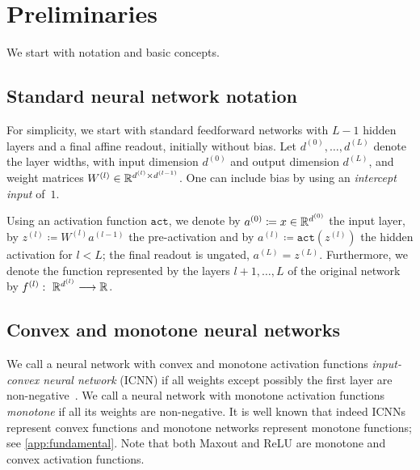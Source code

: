\section{Preliminaries}\label{sec:prelim}

We start with notation and basic concepts.

\subsection{Standard neural network notation}\label{subsec:relu_notation}

For simplicity, we start with
standard feedforward networks with $L-1$ hidden layers and a final affine readout, initially without bias.
Let $d^{(0)}, \ldots, d^{(L)}$ denote the layer widths, with input dimension $d^{(0)}$ and output dimension $d^{(L)}$, and
weight matrices $W^{(l)} \in \mathbb{R}^{d^{(l)} \times d^{(l-1)}}$.
One can include bias by using an \emph{intercept input} of~$1$. 

Using an activation function $\mathtt{act}$, we denote by $a^{(0)} \coloneqq x \in \mathbb{R}^{d^{(0)}}$ the input layer, by $z^{(l)} \coloneqq W^{(l)} a^{(l-1)}$ the pre-activation and by $a^{(l)}\coloneqq\mathtt{act}(z^{(l)})$ the hidden activation for $l<L$; the final readout is ungated, $a^{(L)}=z^{(L)}$.
Furthermore, we denote the function represented by the layers $l+1, \dots, L$ of the original network by $f^{(l)} : \ \mathbb{R} ^ {d^{(l)}} \longrightarrow \mathbb{R}$. 

\subsection{Convex and monotone neural networks}

We call a neural network with convex and monotone activation functions \emph{input-convex neural network} (ICNN) if all weights except possibly the first layer are non-negative~\citep{Amos2017}.
We call a neural network with monotone activation functions \emph{monotone} if all its weights are non-negative. 
It is well known that indeed ICNNs represent convex functions and monotone networks represent monotone functions; see \ref{app:fundamental}.
Note that both Maxout and ReLU are monotone and convex activation functions.